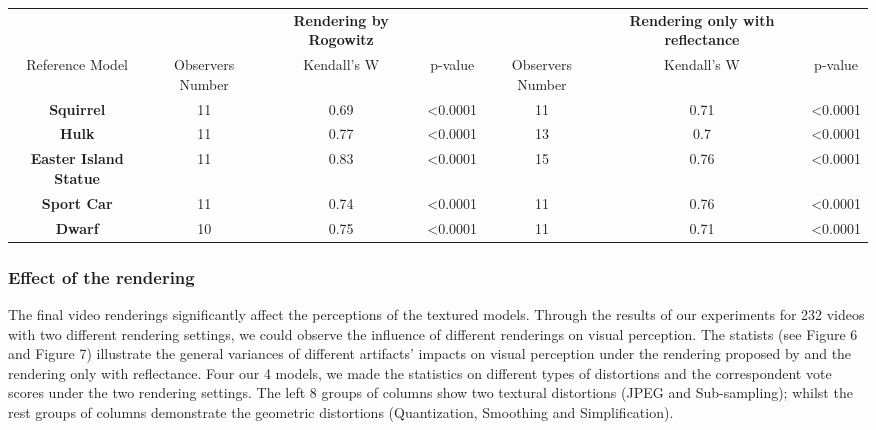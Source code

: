 \begin{table}

    \begin{tabular}{c c c c c c c}
                              &                  & \textbf{Rendering by Rogowitz} &                 &                  & \textbf{Rendering only with reflectance} &                 \\
Reference Model               & Observers Number & Kendall's W                    & p-value         & Observers Number & Kendall's W                             & p-value         \\
\textbf{Squirrel}             & 11               & 0.69                           & \textless0.0001 & 11               & 0.71                                     & \textless0.0001 \\
\textbf{Hulk}                 & 11               & 0.77                           & \textless0.0001 & 13               & 0.7                                      & \textless0.0001 \\
\textbf{Easter Island Statue} & 11               & 0.83                           & \textless0.0001 & 15               & 0.76                                     & \textless0.0001 \\
\textbf{Sport Car}            & 11               & 0.74                           & \textless0.0001 & 11               & 0.76                                     & \textless0.0001 \\
\textbf{Dwarf}                & 10               & 0.75                           & \textless0.0001 & 11               & 0.71                                     & \textless0.0001
    \end{tabular}%
		
   \label{tab-W}
\end{table}


\subsubsection{Effect of the rendering}
The final video renderings significantly affect the perceptions of the textured models. Through the results of our experiments for 232 videos with two different rendering settings, we could observe the influence of different renderings on visual perception. The statists (see Figure 6 and Figure 7) illustrate the general variances of different artifacts’ impacts on visual perception under the rendering proposed by \cite{Rogowitz_2001} and the rendering only with reflectance. Four our 4 models, we made the statistics on different types of distortions and the correspondent vote scores under the two rendering settings. The left 8 groups of columns show two textural distortions (JPEG and Sub-sampling); whilst the rest groups of columns demonstrate the geometric distortions (Quantization, Smoothing and Simplification).

